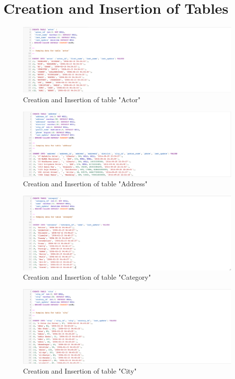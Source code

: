 \documentclass{article}
\begin{document}
\section{Creation and Insertion of Tables}
	\begin{figure}[H]
		\includegraphics[width=\textwidth]{table_actor_cins}
		\caption{Creation and Insertion of table "Actor"}	
	\end{figure}
	\begin{figure}[H]
		\includegraphics[width=\textwidth]{table_address_cins}
		\caption{Creation and Insertion of table "Address"}	
	\end{figure}
	\begin{figure}[H]
		\includegraphics[width=\textwidth]{table_category_cins}
		\caption{Creation and Insertion of table "Category"}	
	\end{figure}
	\begin{figure}[H]
		\includegraphics[width=\textwidth]{table_city_cins}
		\caption{Creation and Insertion of table "City"}	
	\end{figure}
\end{document}
